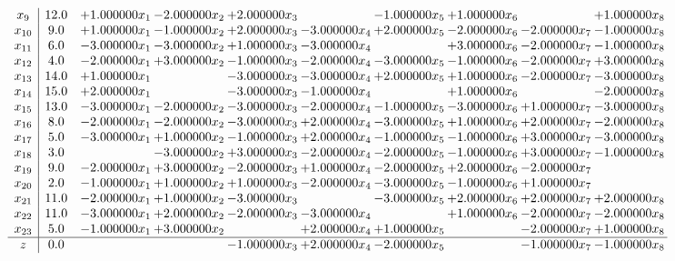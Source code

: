 \documentclass[10pt]{article}
\begin{document}
\[\begin{array}{c| c c@{\hskip 2pt} c@{\hskip 2pt} c@{\hskip 2pt} c@{\hskip 2pt} c@{\hskip 2pt} c@{\hskip 2pt} c@{\hskip 2pt} c@{\hskip 2pt} }
 x_{9}   &  12.0 & + 1.000000 x_{1} & -2.000000 x_{2} & + 2.000000 x_{3} &   & -1.000000 x_{5} & + 1.000000 x_{6} &   & + 1.000000 x_{8}\\
 x_{10}   &  9.0 & + 1.000000 x_{1} & -1.000000 x_{2} & + 2.000000 x_{3} & -3.000000 x_{4} & + 2.000000 x_{5} & -2.000000 x_{6} & -2.000000 x_{7} & -1.000000 x_{8}\\
 x_{11}   &  6.0 & -3.000000 x_{1} & -3.000000 x_{2} & + 1.000000 x_{3} & -3.000000 x_{4} &   & + 3.000000 x_{6} & -2.000000 x_{7} & -1.000000 x_{8}\\
 x_{12}   &  4.0 & -2.000000 x_{1} & + 3.000000 x_{2} & -1.000000 x_{3} & -2.000000 x_{4} & -3.000000 x_{5} & -1.000000 x_{6} & -2.000000 x_{7} & + 3.000000 x_{8}\\
 x_{13}   &  14.0 & + 1.000000 x_{1} &   & -3.000000 x_{3} & -3.000000 x_{4} & + 2.000000 x_{5} & + 1.000000 x_{6} & -2.000000 x_{7} & -3.000000 x_{8}\\
 x_{14}   &  15.0 & + 2.000000 x_{1} &   & -3.000000 x_{3} & -1.000000 x_{4} &   & + 1.000000 x_{6} &   & -2.000000 x_{8}\\
 x_{15}   &  13.0 & -3.000000 x_{1} & -2.000000 x_{2} & -3.000000 x_{3} & -2.000000 x_{4} & -1.000000 x_{5} & -3.000000 x_{6} & + 1.000000 x_{7} & -3.000000 x_{8}\\
 x_{16}   &  8.0 & -2.000000 x_{1} & -2.000000 x_{2} & -3.000000 x_{3} & + 2.000000 x_{4} & -3.000000 x_{5} & + 1.000000 x_{6} & + 2.000000 x_{7} & -2.000000 x_{8}\\
 x_{17}   &  5.0 & -3.000000 x_{1} & + 1.000000 x_{2} & -1.000000 x_{3} & + 2.000000 x_{4} & -1.000000 x_{5} & -1.000000 x_{6} & + 3.000000 x_{7} & -3.000000 x_{8}\\
 x_{18}   &  3.0  &   & -3.000000 x_{2} & + 3.000000 x_{3} & -2.000000 x_{4} & -2.000000 x_{5} & -1.000000 x_{6} & + 3.000000 x_{7} & -1.000000 x_{8}\\
 x_{19}   &  9.0 & -2.000000 x_{1} & + 3.000000 x_{2} & -2.000000 x_{3} & + 1.000000 x_{4} & -2.000000 x_{5} & + 2.000000 x_{6} & -2.000000 x_{7} &   \\
 x_{20}   &  2.0 & -1.000000 x_{1} & + 1.000000 x_{2} & + 1.000000 x_{3} & -2.000000 x_{4} & -3.000000 x_{5} & -1.000000 x_{6} & + 1.000000 x_{7} &   \\
 x_{21}   &  11.0 & -2.000000 x_{1} & + 1.000000 x_{2} & -3.000000 x_{3} &   & -3.000000 x_{5} & + 2.000000 x_{6} & + 2.000000 x_{7} & + 2.000000 x_{8}\\
 x_{22}   &  11.0 & -3.000000 x_{1} & + 2.000000 x_{2} & -2.000000 x_{3} & -3.000000 x_{4} &   & + 1.000000 x_{6} & -2.000000 x_{7} & -2.000000 x_{8}\\
 x_{23}   &  5.0 & -1.000000 x_{1} & + 3.000000 x_{2} &   & + 2.000000 x_{4} & + 1.000000 x_{5} &   & -2.000000 x_{7} & + 1.000000 x_{8}\\
\hline
z    &  0.0  &    &   & -1.000000 x_{3} & + 2.000000 x_{4} & -2.000000 x_{5} &   & -1.000000 x_{7} & -1.000000 x_{8}\\
\end{array}\]
\end{document}
